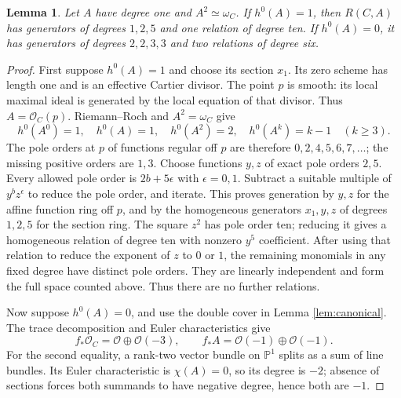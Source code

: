 \documentclass[11pt,reqno,letterpaper]{amsart}
\newcommand{\PP}{\mathbb P}
\newcommand{\OO}{\mathcal O}
\newtheorem{lemma}[theorem]{Lemma}
\theoremstyle{definition}
\numberwithin{equation}{section}
\begin{document}
\begin{lemma}\label{lem:halfring}
Let $A$ have degree one and $A^2\simeq\omega_C$.
If $h^0(A)=1$, then $R(C,A)$ has generators of degrees $1,2,5$
and one relation of degree ten.
If $h^0(A)=0$, it has generators of degrees $2,2,3,3$
and two relations of degree six.
\end{lemma}
\begin{proof}
First suppose $h^0(A)=1$ and choose its section $x_1$.
Its zero scheme has length one and is an effective Cartier divisor.
The point $p$ is smooth: its local maximal ideal is generated by
the local equation of that divisor.
Thus $A=\OO_C(p)$.
Riemann--Roch and $A^2=\omega_C$ give
\[
 h^0(A^0)=1,\quad h^0(A)=1,\quad h^0(A^2)=2,\quad
 h^0(A^k)=k-1\quad(k\ge3).
\]
The pole orders at $p$ of functions regular off $p$ are therefore
$0,2,4,5,6,7,\ldots$; the missing positive orders are $1,3$.
Choose functions $y,z$ of exact pole orders $2,5$.
Every allowed pole order is $2b+5\epsilon$ with $\epsilon=0,1$.
Subtract a suitable multiple of $y^bz^\epsilon$ to reduce the pole order,
and iterate. This proves generation by $y,z$ for the affine function
ring off $p$, and by the homogeneous generators $x_1,y,z$ of degrees
$1,2,5$ for the section ring.
The square $z^2$ has pole order ten; reducing it gives a homogeneous
relation of degree ten with nonzero $y^5$ coefficient.
After using that relation to reduce the exponent of $z$ to $0$ or $1$,
the remaining monomials in any fixed degree have distinct pole orders.
They are linearly independent and form the full space counted above.
Thus there are no further relations.

Now suppose $h^0(A)=0$, and use the double cover in Lemma \ref{lem:canonical}.
The trace decomposition and Euler characteristics give
\[
 f_*\OO_C=\OO\oplus\OO(-3),\qquad
 f_*A=\OO(-1)\oplus\OO(-1).
\]
For the second equality, a rank-two vector bundle on $\PP^1$ splits as
a sum of line bundles. Its Euler characteristic is $\chi(A)=0$,
so its degree is $-2$; absence of sections forces both summands to have
negative degree, hence both are $-1$.


\end{proof}
\end{document}
